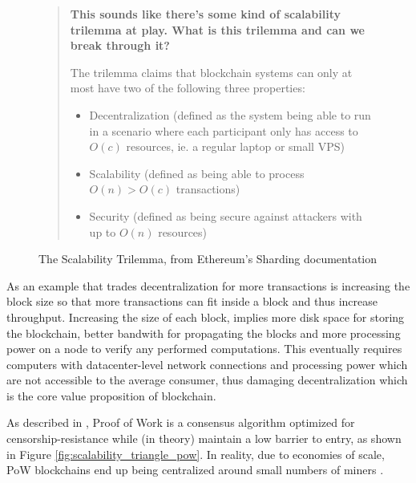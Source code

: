 \begin{figure}[H]
\begin{quote}
    \textbf{This sounds like there’s some kind of scalability trilemma at play. What is this trilemma and can we break through it?}

    The trilemma claims that blockchain systems can only at most have two of the following three properties:

    \begin{itemize}
        \item Decentralization (defined as the system being able to run in a scenario where each participant only has access to $O(c)$ resources, ie. a regular laptop or small VPS)
        \item Scalability (defined as being able to process $O(n) > O(c)$ transactions)
        \item Security (defined as being secure against attackers with up to $O(n)$ resources)
    \end{itemize}
\end{quote}
\label{fig:trilemma}
\caption{The Scalability Trilemma, from Ethereum's Sharding documentation \cite{sharding}}
\end{figure}

As an example that trades decentralization for more transactions is increasing the block size so that more transactions can fit inside a block and thus increase throughput. Increasing the size of each block, implies more disk space for storing the blockchain, better bandwith for propagating the blocks and more processing power on a node to verify any performed computations. This eventually requires computers with datacenter-level network connections and processing power which are not accessible to the average consumer, thus damaging decentralization which is the core value proposition of blockchain. %

As described in \cite{scaling-trustless-models}, Proof of Work is a consensus algorithm optimized for censorship-resistance while (in theory) maintain a low barrier to entry, as shown in Figure \ref{fig:scalability_triangle_pow}. In reality, due to economies of scale, PoW blockchains end up being centralized around small numbers of miners \cite{Gencer2018DecentralizationIB}. 

